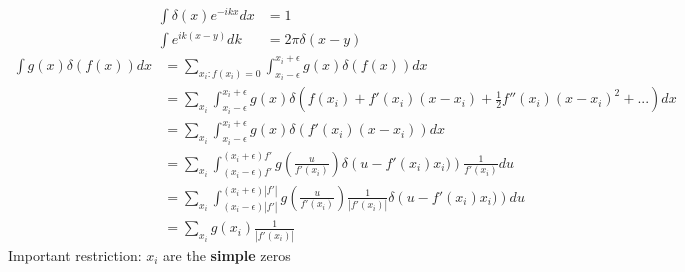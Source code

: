 \documentclass[10pt,a4paper]{book}
\theoremstyle{definition}
\begin{document}
\begin{align}
    \int\delta(x)e^{-ikx}dx&=1\\
    \int e^{ik(x-y)}dk&=2\pi\delta(x-y)
\end{align}
\begin{align}
    \int g(x)\delta(f(x))dx &= \sum_{x_i:f(x_i)=0}\int_{x_i-\epsilon}^{x_i+\epsilon} g(x)\delta(f(x))dx\\
    &= \sum_{x_i}\int_{x_i-\epsilon}^{x_i+\epsilon} g(x)\delta\left(f(x_i)+f'(x_i)(x-x_i)+\frac{1}{2}f''(x_i)(x-x_i)^2+...\right)dx\\
    &= \sum_{x_i}\int_{x_i-\epsilon}^{x_i+\epsilon} g(x)\delta\left(f'(x_i)(x-x_i)\right)dx\\
    &= \sum_{x_i}\int_{(x_i-\epsilon)f'}^{(x_i+\epsilon)f'} g\left(\frac{u}{f'(x_i)}\right)\delta\left(u-f'(x_i)x_i)\right)\frac{1}{f'(x_i)}du\\
    &= \sum_{x_i}\int_{(x_i-\epsilon)|f'|}^{(x_i+\epsilon)|f'|} g\left(\frac{u}{f'(x_i)}\right)\frac{1}{|f'(x_i)|}\delta\left(u-f'(x_i)x_i)\right)du\\
    &= \sum_{x_i} g(x_i)\frac{1}{|f'(x_i)|}
\end{align}
Important restriction: $x_i$ are the {\bf simple} zeros
\end{document}
